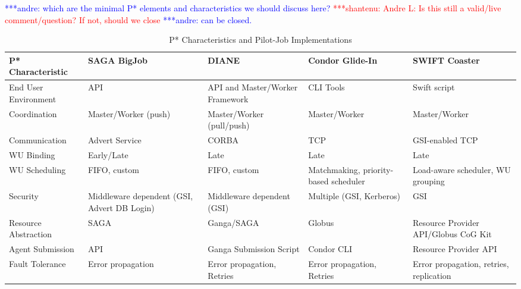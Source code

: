 \documentclass[conference,final]{IEEEtran}
\newcommand{\jhanote}[1]{ {\textcolor{red} { ***shantenu: #1 }}}
\newcommand{\alnote}[1]{ {\textcolor{blue} { ***andre: #1 }}}
\newcommand{\alnote}[1]{}
\newcommand{\jhanote}[1]{}
\begin{document}

\alnote{which are the minimal P* elements and characteristics we
  should discuss here?}  \jhanote{Andre L: Is this still a valid/live
  comment/question? If not, should we close}\alnote{can be closed.}

\begin{table}[t]
\centering
\begin{tabular}{|l|p{2.5cm}|p{2.5cm}|p{2.5cm}|p{2.5cm}|}
	\hline
	\textbf{P* Characteristic}
	&\textbf{SAGA BigJob} &\textbf{DIANE} &\textbf{Condor Glide-In} &   
	\textbf{SWIFT Coaster} \\ \hline
End User Environment &API &API and Master/Worker Framework &CLI Tools &Swift script\\ \hline

Coordination &Master/Worker (push) &Master/Worker (pull/push) &Master/Worker &Master/Worker \\ \hline
	
Communication &Advert Service &CORBA &TCP &GSI-enabled TCP \\ \hline

WU Binding &Early/Late &Late &Late &Late\\
\hline
WU Scheduling &FIFO, custom &FIFO, custom &Matchmaking, priority-based scheduler 
&Load-aware scheduler, WU grouping\\
\hline

Security &Middleware dependent (GSI, Advert DB Login) &Middleware dependent (GSI) &Multiple (GSI, 
Kerberos) &GSI\\ \hline

Resource Abstraction &SAGA &Ganga/SAGA &Globus &Resource Provider API/Globus CoG 
Kit \\ 
\hline
Agent Submission &API &Ganga Submission Script &Condor CLI 
&Resource Provider API\\
\hline
Fault Tolerance &Error propagation &Error propagation, Retries &Error propagation, Retries &Error propagation, retries, replication\\
\hline
	
\end{tabular}
\caption{P* Characteristics and Pilot-Job Implementations}\label{table:pilot-job-comparison}
\end{table}
\end{document}
